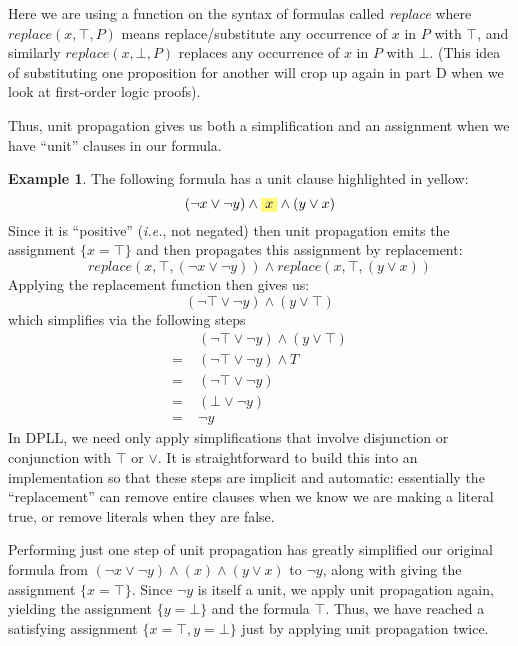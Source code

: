 \documentclass{article}
\theoremstyle{definition}
\newtheorem{example}{Example}
\newcommand{\ie}{\emph{i.e.}}
\newcommand{\subst}[3]{\textit{replace}(#2, #1, #3)}
\newcommand{\highlight}[1]{%
  \colorbox{yellow!50}{$\displaystyle#1$}}
\begin{document}
Here we are using a function on the syntax of formulas called
\emph{replace} where $\subst{\top}{x}{P}$ means replace/substitute any
occurrence of $x$ in $P$ with $\top$, and similarly $\subst{\bot}{x}{P}$
replaces any occurrence of $x$ in $P$ with $\bot$.  (This idea of
substituting one proposition for another will crop up again in part D
when we look at first-order logic proofs).

Thus, unit propagation gives us both a simplification and an assignment
when we have ``unit'' clauses in our formula.

\begin{example}
The following formula has a unit clause highlighted in yellow:
%
\begin{equation*}
(\neg x \vee \neg y) \wedge \highlight{x} \wedge (y \vee x)
\end{equation*}
%
Since it is ``positive'' (\ie{}, not negated) then unit propagation
emits the assignment $\{x = \top\}$ and then propagates this
assignment by replacement:
\begin{equation*}
\subst{\top}{x}{(\neg x \vee \neg y)} \wedge \subst{\top}{x}{(y \vee x)}
\end{equation*}
Applying the replacement function then gives us:
%
\begin{equation*}
(\neg \top \vee \neg y) \wedge (y \vee \top)
\end{equation*}
%
which simplifies via the following steps
%
\begin{align*}
 & (\neg \top \vee \neg y) \wedge (y \vee \top) \\
= \; & (\neg \top \vee \neg y) \wedge T \\
= \; & (\neg \top \vee \neg y) \\
= \; & (\bot \vee \neg y) \\
= \; & \neg y
\end{align*}
%
In DPLL, we need only apply simplifications that involve disjunction
or conjunction with $\top$ or $\vee$. It is straightforward to build
this into an implementation so that these steps are implicit and
automatic: essentially the ``replacement'' can remove entire clauses when
we know we are making a literal true, or remove literals when they 
are false.

Performing just one step of unit propagation has greatly simplified
our original formula from $(\neg x \vee \neg y) \wedge (x)
\wedge (y \vee x)$ to $\neg y$, along with giving the assignment
$\{x = \top\}$.  Since $\neg y$ is itself a unit, we apply unit
propagation again, yielding the assignment $\{y = \bot\}$ and
the formula $\top$. Thus, we have reached a satisfying assignment
$\{x = \top, y = \bot\}$ just by applying unit propagation twice.
\end{example}
\end{document}
